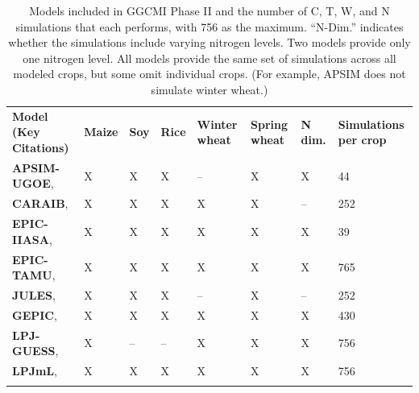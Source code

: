 \documentclass[gmd, manuscript]{copernicus} %
\begin{document}
\begin{table}[t]
\caption{Models included in GGCMI Phase II and the number of C, T, W, and N simulations that each performs, with 756 as the maximum. ``N-Dim.'' indicates whether the simulations include varying nitrogen levels. Two models provide only one nitrogen level. All models provide the same set of simulations across all modeled crops, but some omit individual crops. (For example, APSIM does not simulate winter wheat.)}
\label{table:models}
	\begin{tabular}{p{6cm} p{1cm} p{1cm} p{1cm} p{1cm} p{1cm} p{1cm} p{1.5cm}}
        \tophline
        {\textbf{Model (Key Citations)}}&{\textbf{Maize}}&{\textbf{Soy}}&{\textbf{Rice}}&{\textbf{Winter wheat}}&{\textbf{Spring wheat}}&{\textbf{N dim.}}&{\textbf{Simulations per crop}}\\ \middlehline
        {\textbf{APSIM-UGOE},    \citet{KEATING2003267, HOLZWORTH2014327}} & {X} & {X} & {X} & {--} & {X} & {X} & {44}\\ \middlehline
        {\textbf{CARAIB},        \citet{Dury2011, Pirttioja2015}} & {X} & {X} & {X} & {X} & {X} & {--} & {252}\\ \middlehline
        {\textbf{EPIC-IIASA},    \citet{BALKOVIC2014}} & {X} & {X} & {X} & {X} & {X} & {X} & {39}\\  \middlehline
        {\textbf{EPIC-TAMU},     \citet{Izaurralde06}} & {X} & {X} & {X} & {X} & {X} & {X} & {765}\\ \middlehline
        {\textbf{JULES},        \citet{Osborne2015, Williams2015, Williams2017}} & {X} & {X} & {X} & {--} & {X} & {--} & {252}\\ \middlehline
        {\textbf{GEPIC},         \citet{LIU2007478, FOLBERTH201221}} & {X} & {X} & {X} & {X} & {X} & {X} & {430}\\ \middlehline
        {\textbf{LPJ-GUESS},     \citet{Lindeskog2013, Olin2015}} & {X} & {--} & {--} & {X} & {X} & {X} & {756}\\  \middlehline
        {\textbf{LPJmL},         \citet{von_Bloh_implementing_2018}} & {X} & {X} & {X} & {X} & {X} & {X} & {756}\\ \middlehline

\end{tabular}
\end{table}
\end{document}
